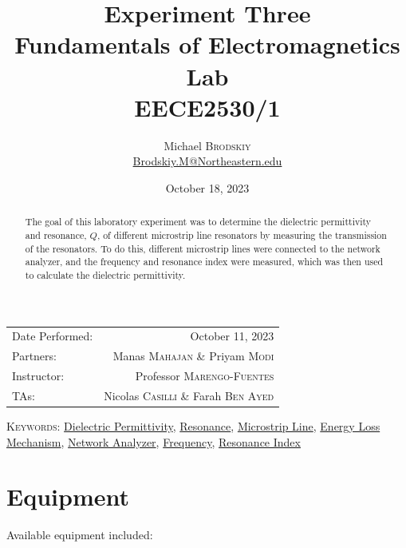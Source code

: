 \documentclass[
	letterpaper, %
	10pt, %
]{CSUniSchoolLabReport}
\title{Experiment Three\\ Fundamentals of Electromagnetics Lab \\ EECE2530/1} %
\author{Michael \textsc{Brodskiy}\\ \small \href{mailto:Brodskiy.M@Northeastern.edu}{Brodskiy.M@Northeastern.edu}}
\date{October 18, 2023} %
\begin{document}
\maketitle %

\begin{center}
	\begin{tabular}{l r}
		Date Performed: & October 11, 2023 \\ %
        Partners: & Manas \textsc{Mahajan} \& Priyam \textsc{Modi} \\ %
		Instructor: & Professor \textsc{Marengo-Fuentes} \\ %
        TAs: & Nicolas \textsc{Casilli} \& Farah \textsc{Ben Ayed} \\ %
	\end{tabular}
\end{center}

\newpage

\begin{abstract}

The goal of this laboratory experiment was to determine the dielectric permittivity and resonance, $Q$, of different microstrip line resonators by measuring the transmission of the resonators. To do this, different microstrip lines were connected to the network analyzer, and the frequency and resonance index were measured, which was then used to calculate the dielectric permittivity.

\end{abstract}

\begin{flushleft}

  \textsc{Keywords:} \underline{Dielectric Permittivity}, \underline{Resonance}, \underline{Microstrip Line}, \underline{Energy Loss Mechanism}, \underline{Network Analyzer}, \underline{Frequency}, \underline{Resonance Index}

\end{flushleft}

\newpage

\section{Equipment}

\hspace{.5 in} Available equipment included:\\
\end{document}
